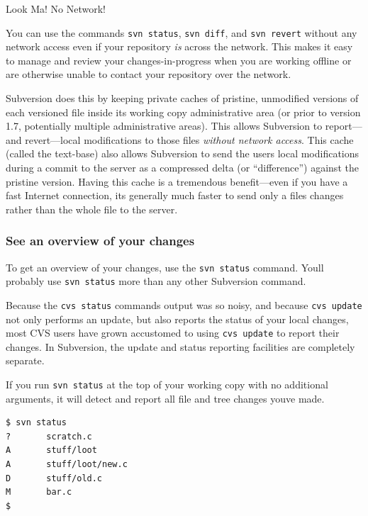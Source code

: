 Look Ma! No Network!

You can use the commands \texttt{svn\ status}, \texttt{svn\ diff}, and
\texttt{svn\ revert} without any network access even if your repository
\emph{is} across the network. This makes it easy to manage and review
your changes-in-progress when you are working offline or are otherwise
unable to contact your repository over the network.

Subversion does this by keeping private caches of pristine, unmodified
versions of each versioned file inside its working copy administrative
area (or prior to version 1.7, potentially multiple administrative
areas). This allows Subversion to report---and revert---local
modifications to those files \emph{without network access}. This cache
(called the text-base) also allows Subversion to send the
user\textquotesingle s local modifications during a commit to the server
as a compressed delta (or ``difference'') against the pristine version.
Having this cache is a tremendous benefit---even if you have a fast
Internet connection, it\textquotesingle s generally much faster to send
only a file\textquotesingle s changes rather than the whole file to the
server.

\subsubsection{See an overview of your
changes}\label{svn.tour.cycle.examine.status}

To get an overview of your changes, use the \texttt{svn\ status}
command. You\textquotesingle ll probably use \texttt{svn\ status} more
than any other Subversion command.

Because the \texttt{cvs\ status} command\textquotesingle s output was so
noisy, and because \texttt{cvs\ update} not only performs an update, but
also reports the status of your local changes, most CVS users have grown
accustomed to using \texttt{cvs\ update} to report their changes. In
Subversion, the update and status reporting facilities are completely
separate.

If you run \texttt{svn\ status} at the top of your working copy with no
additional arguments, it will detect and report all file and tree
changes you\textquotesingle ve made.

\begin{verbatim}
$ svn status
?       scratch.c
A       stuff/loot
A       stuff/loot/new.c
D       stuff/old.c
M       bar.c
$
\end{verbatim}

